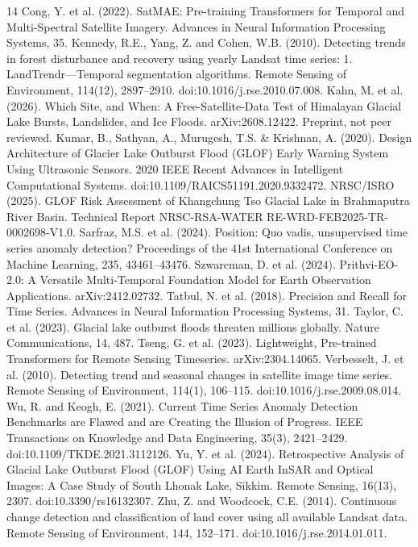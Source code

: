 \documentclass[9pt,twocolumn]{article}
\begin{document}
\begin{thebibliography}{14}
 Cong, Y. et al. (2022). SatMAE: Pre-training Transformers for Temporal and Multi-Spectral Satellite Imagery. Advances in Neural Information Processing Systems, 35.
 Kennedy, R.E., Yang, Z. and Cohen, W.B. (2010). Detecting trends in forest disturbance and recovery using yearly Landsat time series: 1. LandTrendr---Temporal segmentation algorithms. Remote Sensing of Environment, 114(12), 2897--2910. doi:10.1016/j.rse.2010.07.008.
 Kahn, M. et al. (2026). Which Site, and When: A Free-Satellite-Data Test of Himalayan Glacial Lake Bursts, Landslides, and Ice Floods. arXiv:2608.12422. Preprint, not peer reviewed.
 Kumar, B., Sathyan, A., Murugesh, T.S. \& Krishnan, A. (2020). Design Architecture of Glacier Lake Outburst Flood (GLOF) Early Warning System Using Ultrasonic Sensors. 2020 IEEE Recent Advances in Intelligent Computational Systems. doi:10.1109/RAICS51191.2020.9332472.
 NRSC/ISRO (2025). GLOF Risk Assessment of Khangchung Tso Glacial Lake in Brahmaputra River Basin. Technical Report NRSC-RSA-WATER RE-WRD-FEB2025-TR-0002698-V1.0.
 Sarfraz, M.S. et al. (2024). Position: Quo vadis, unsupervised time series anomaly detection? Proceedings of the 41st International Conference on Machine Learning, 235, 43461--43476.
 Szwarcman, D. et al. (2024). Prithvi-EO-2.0: A Versatile Multi-Temporal Foundation Model for Earth Observation Applications. arXiv:2412.02732.
 Tatbul, N. et al. (2018). Precision and Recall for Time Series. Advances in Neural Information Processing Systems, 31.
 Taylor, C. et al. (2023). Glacial lake outburst floods threaten millions globally. Nature Communications, 14, 487.
 Tseng, G. et al. (2023). Lightweight, Pre-trained Transformers for Remote Sensing Timeseries. arXiv:2304.14065.
 Verbesselt, J. et al. (2010). Detecting trend and seasonal changes in satellite image time series. Remote Sensing of Environment, 114(1), 106--115. doi:10.1016/j.rse.2009.08.014.
 Wu, R. and Keogh, E. (2021). Current Time Series Anomaly Detection Benchmarks are Flawed and are Creating the Illusion of Progress. IEEE Transactions on Knowledge and Data Engineering, 35(3), 2421--2429. doi:10.1109/TKDE.2021.3112126.
 Yu, Y. et al. (2024). Retrospective Analysis of Glacial Lake Outburst Flood (GLOF) Using AI Earth InSAR and Optical Images: A Case Study of South Lhonak Lake, Sikkim. Remote Sensing, 16(13), 2307. doi:10.3390/rs16132307.
 Zhu, Z. and Woodcock, C.E. (2014). Continuous change detection and classification of land cover using all available Landsat data. Remote Sensing of Environment, 144, 152--171. doi:10.1016/j.rse.2014.01.011.
\end{thebibliography}
\end{document}
